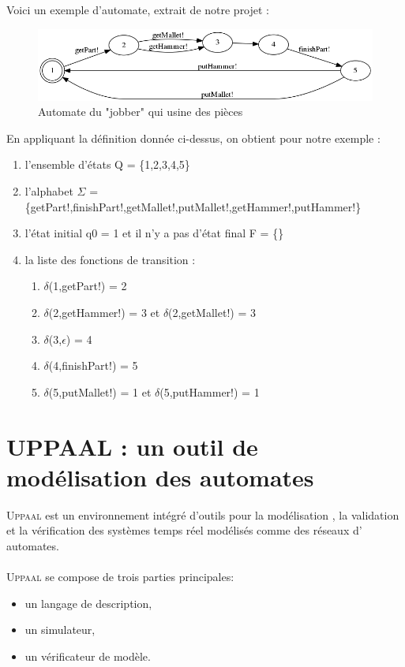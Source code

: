 \documentclass[12pt,a4paper]{report}
\begin{document}
    Voici un exemple d'automate, extrait de notre projet :\\

\begin{figure}[h]
	\centering
	\includegraphics[scale=0.5]{ressources/img.png}
	\caption{Automate du "jobber" qui usine des pièces}
\end{figure}
  
    En appliquant la définition donnée ci-dessus, on obtient pour notre exemple :
\begin{enumerate}
  \item l'ensemble d'états Q = \{1,2,3,4,5\}
  \item l'alphabet $\Sigma$ = \{getPart!,finishPart!,getMallet!,putMallet!,getHammer!,putHammer!\}
  \item l'état initial q0 = 1 et il n'y a pas d'état final F = \{\}
  \item la liste des fonctions de transition : 
  \begin{enumerate}
    \item $\delta$(1,getPart!) = 2 
    \item $\delta$(2,getHammer!) = 3 et $\delta$(2,getMallet!) = 3 
    \item $\delta$(3,$\epsilon$) = 4 
    \item $\delta$(4,finishPart!) = 5 
    \item $\delta$(5,putMallet!) = 1 et $\delta$(5,putHammer!) = 1 
  \end{enumerate}
\end{enumerate}

\section{UPPAAL : un outil de modélisation des automates}
\textsc{Uppaal} est un environnement intégré d'outils pour la modélisation , la validation et la vérification des systèmes temps réel modélisés comme des réseaux d' automates.
\\\\
\textsc{Uppaal} se compose de trois parties principales: 
\begin{itemize}[label=$\circ$]
  \item{un langage de description,}
  \item{un simulateur,}
  \item{un vérificateur de modèle.}
\end{itemize} 
\end{document}
